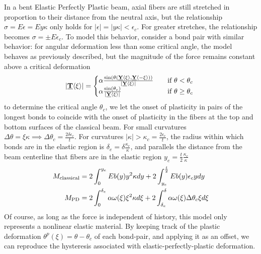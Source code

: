 \documentclass[11pt]{amsart}
\newcommand\vstate[3]{%
	\mathbf{\underline{#1}}%
	\ifstrempty{#2}{}{[#2]}%
	\ifstrempty{#3}{}{\langle #3 \rangle}}
\begin{document}
In a bent Elastic Perfectly Plastic beam, axial fibers are still stretched in proportion to their distance from the neutral axis, but the relationship \(\sigma = E\epsilon = Ey\kappa\) only holds for \(|\epsilon| = |y\kappa| < \epsilon_c\). 
For greater stretches, the relationship becomes \(\sigma = \pm E\epsilon_c \). 
To model this behavior, consider a bond pair with similar behavior: for angular deformation less than some critical angle, the model behaves as previously described, but the magnitude of the force remains constant above a critical deformation
%
\[ 
|\vstate{T}{}{\xi}| = 
  \begin{cases}
    \alpha \frac{\sin(\theta(\vstate{Y}{}{\xi},\vstate{Y}{}{\mathbf{-\xi}}))}{|\vstate{Y}{}{\xi}|} & \quad \text{if } \theta < \theta_c\\
    \alpha \frac{\sin(\theta_c)}{|\vstate{Y}{}{\xi}|} & \quad \text{if } \theta \geq \theta_c\
  \end{cases}
\]
%
to determine the critical angle \(\theta_c\), we let the onset of plasticity in pairs of the longest bonds to coincide with the onset of plasticity in the fibers at the top and bottom surfaces of the classical beam. 
For small curvatures \(\Delta\theta = \xi\kappa\implies\Delta\theta_c = \frac{2\delta\epsilon_c}{t}\). 
For curvatures \(|\kappa| > \kappa_c=\frac{2\epsilon_c}{t}\), the radius within which bonds are in the elastic region is \(\delta_e = \delta \frac{\kappa_c}{\kappa}\), and parallels the distance from the beam centerline that fibers are in the elastic region \(y_e = \frac{t}{2} \frac{\kappa_c}{\kappa}\)
%
\begin{align}
  M_\text{classical} &= 2 \int_{0}^{y_e}E b(y)y^2 \kappa dy +2 \int_{y_e}^{\frac{t}{2}}E b(y) \epsilon_c y dy\notag \\
  M_\text{PD} &= 2 \int_{0}^{\delta_e}\alpha \omega(\xi) \xi^2 \kappa d\xi +2 \int_{\delta_e}^{\delta}\alpha \omega(\xi) \Delta\theta_c \xi d\xi \notag
\end{align}
%
Of course, as long as the force is independent of history, this model only represents a nonlinear elastic material. 
By keeping track of the plastic deformation \(\theta^p (\xi) = \theta-\theta_c\) of each bond-pair, and applying it as an offset, we can reproduce the hysteresis associated with elastic-perfectly-plastic deformation.
%
%
\end{document}
